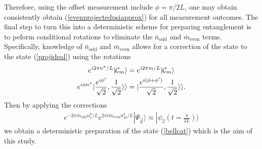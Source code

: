\documentclass{WileyMSP-template}
\begin{document}
Therefore, using the offset measurement include $ \phi = \pi/2L$, one may obtain consistently obtain (\ref{evenprojectedpsiapprox}) for all measurement outcomes.  The final step to turn this into a deterministic scheme for preparing entanglement is to peform conditional rotations to eliminate the $ \bar{n}_\text{odd} $ and  $ \bar{m}_\text{even} $ terms.  Specifically, knowledge of $ \bar{n}_\text{odd} $ and  $ \bar{m}_\text{even} $  allows for a correction of the state to the state (\ref{projideal}) using the rotations
%
\begin{align}
e^{i 2 \pi n^a /L } | {\cal C}_m \rangle & = e^{i 2 \pi m /L } | {\cal C}_m \rangle \label{correction1} \\
e^{i \phi n^a } |\frac{e^{ i \phi' }}{\sqrt{2}},\frac{1}{\sqrt{2}}\rangle\rangle & = |\frac{e^{ i (\phi+\phi')  }}{\sqrt{2}},\frac{1}{\sqrt{2}}\rangle\rangle .
\label{correction2}
\end{align}
%
Then by applying the corrections
%
\begin{align}
e^{-2 \pi i \bar{n}_{\text{odd}}  n^a_1/L }  e^{2 \pi i \bar{m}_{\text{even}}  n^a_M/L }  | \Psi_{\vec{q}} \rangle \approx | \psi_2 (t= \frac{\pi}{2L} ) \rangle
\label{correction3}
\end{align}
%
we obtain a deterministic preparation of the state (\ref{bellcat}) which is the aim of this study.
\end{document}
